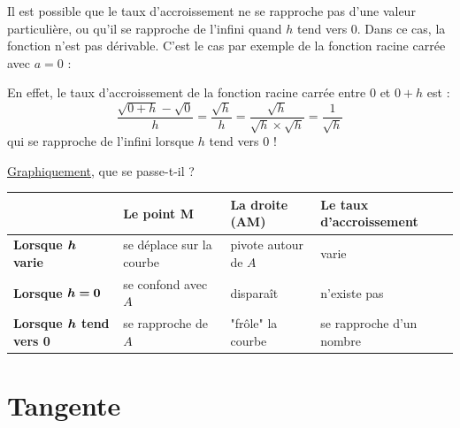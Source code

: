 \documentclass[a4paper,11pt]{article}
\begin{document}
\begin{crmq}
Il est possible que le taux d'accroissement ne se rapproche pas d'une valeur particulière, ou qu'il se rapproche de l'infini quand $h$ tend vers 0. Dans ce cas, la fonction n'est pas dérivable. C'est le cas par exemple de la fonction racine carrée avec $a=0$ :

En effet, le taux d'accroissement de la fonction racine carrée entre 0 et $0+h$ est : \[\frac{\sqrt{0+h}-\sqrt{0}}{h}=\frac{\sqrt{h}}{h}=\frac{\sqrt{h}}{\sqrt{h} \times \sqrt{h}}=\frac{1}{\sqrt{h}}\] qui se rapproche de l'infini lorsque $h$ tend vers 0 !
\end{crmq}

\begin{cillustr}
\uline{Graphiquement}, que se passe-t-il ?
\renewcommand{\arraystretch}{2}
{\small \begin{center}
	\begin{tabularx}{\linewidth}{|Y|Y|Y|Y|}
	& \textbf{Le point M} & \textbf{La droite (AM)} & \textbf{Le taux d'accroissement} \\
	\hline
	\textbf{Lorsque $\bm{h}$ varie} & se déplace sur la courbe & pivote autour de $A$ & varie \\
	\hline
	\textbf{Lorsque $\bm{h=0}$} & se confond avec $A$ & disparaît & n'existe pas \\
	\hline 
	\textbf{Lorsque $\bm{h}$ tend vers 0 }& se rapproche de $A$ & "frôle" la courbe & se rapproche d'un nombre \\
	\hline 
\end{tabularx} 
\end{center}}
\end{cillustr}

\section{Tangente}
\end{document}
